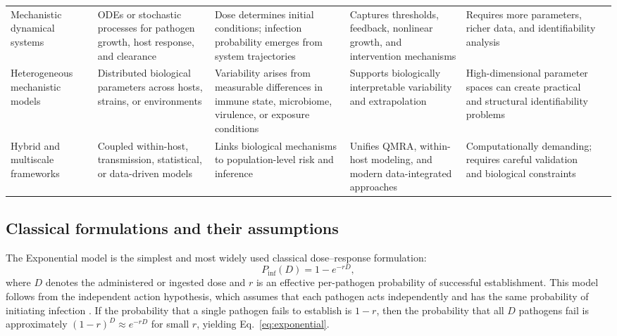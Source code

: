 \documentclass[11pt]{article}
\begin{document}
\begin{landscape}
\begin{table}[p]
\begin{tabularx}{\linewidth}{>{\raggedright\arraybackslash}p{2.6cm} >{\raggedright\arraybackslash}X >{\raggedright\arraybackslash}X >{\raggedright\arraybackslash}X >{\raggedright\arraybackslash}X >{\raggedright\arraybackslash}X}
Mechanistic dynamical systems &
ODEs or stochastic processes for pathogen growth, host response, and clearance &
Dose determines initial conditions; infection probability emerges from system trajectories &
Captures thresholds, feedback, nonlinear growth, and intervention mechanisms &
Requires more parameters, richer data, and identifiability analysis &
\cite{Mideo2008WithinHost,Murray2002MathematicalBiology1,Perelson2002ModellingViral} \\

Heterogeneous mechanistic models &
Distributed biological parameters across hosts, strains, or environments &
Variability arises from measurable differences in immune state, microbiome, virulence, or exposure conditions &
Supports biologically interpretable variability and extrapolation &
High-dimensional parameter spaces can create practical and structural identifiability problems &
\cite{NASEM2018MicrobiomeRisk,Pouillot2015Listeria,Thaiss2016Microbiome} \\

Hybrid and multiscale frameworks &
Coupled within-host, transmission, statistical, or data-driven models &
Links biological mechanisms to population-level risk and inference &
Unifies QMRA, within-host modeling, and modern data-integrated approaches &
Computationally demanding; requires careful validation and biological constraints &
\cite{Capone2022QMRAEffectMeasures,Handel2015CrossingScale,Mideo2008WithinHost} \\

\bottomrule
\end{tabularx}
\end{table}
\end{landscape}

\subsection{Classical formulations and their assumptions}

The Exponential model is the simplest and most widely used classical dose--response formulation:
\begin{equation}
P_{\mathrm{inf}}(D) = 1 - e^{-rD},
\label{eq:exponential}
\end{equation}
where $D$ denotes the administered or ingested dose and $r$ is an effective per-pathogen probability of successful establishment. This model follows from the independent action hypothesis, which assumes that each pathogen acts independently and has the same probability of initiating infection \cite{Haas2014QMRA,Teunis2000BetaPoissonNotSingleHit}. If the probability that a single pathogen fails to establish is $1-r$, then the probability that all $D$ pathogens fail is approximately $(1-r)^D \approx e^{-rD}$ for small $r$, yielding Eq.~\eqref{eq:exponential}.
\end{document}
